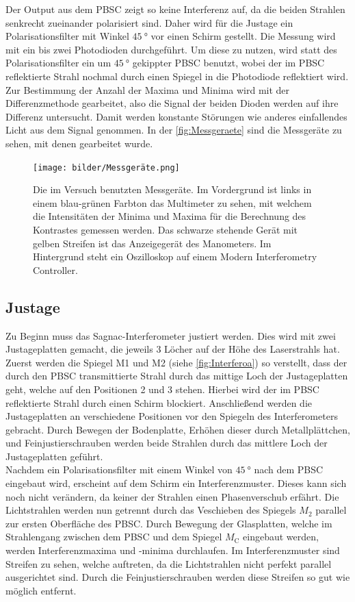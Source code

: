 \noindent Der Output aus dem PBSC zeigt so keine Interferenz auf, da die beiden Strahlen senkrecht zueinander polarisiert sind. Daher wird für die Justage ein Polarisationsfilter mit 
Winkel $\SI{45}{\degree}$ vor einen Schirm gestellt. Die Messung wird mit ein bis zwei Photodioden durchgeführt. Um diese zu nutzen, wird statt des Polarisationsfilter ein um 
$\SI{45}{\degree}$ gekippter PBSC benutzt, wobei der im PBSC reflektierte Strahl nochmal durch einen Spiegel in die Photodiode reflektiert wird. Zur Bestimmung der Anzahl der Maxima 
und Minima wird mit der Differenzmethode gearbeitet, also die Signal der beiden Dioden werden auf ihre Differenz untersucht. Damit werden konstante Störungen wie anderes einfallendes 
Licht aus dem Signal genommen. In der \autoref{fig:Messgeraete} sind die Messgeräte zu sehen, mit denen gearbeitet wurde.

\begin{figure}[H]
    \centering
    \texttt{[image: bilder/Messgeräte.png]}
    \caption{Die im Versuch benutzten Messgeräte. Im Vordergrund ist links in einem blau-grünen Farbton das Multimeter zu sehen, mit welchem die Intensitäten der Minima und Maxima für 
    die Berechnung des Kontrastes gemessen werden. Das schwarze stehende Gerät mit gelben Streifen ist das Anzeigegerät des Manometers. Im Hintergrund steht ein Oszilloskop auf einem 
    Modern Interferometry Controller.}
    \label{fig:Messgeraete}
\end{figure}


\subsection{Justage}

\noindent Zu Beginn muss das Sagnac-Interferometer justiert werden. Dies wird mit zwei Justageplatten gemacht, die jeweils 3 Löcher auf der Höhe des Laserstrahls hat. 
Zuerst werden die Spiegel M1 und M2 (siehe \autoref{fig:Interferoa}) so verstellt, dass der durch den PBSC transmittierte Strahl durch das mittige Loch der Justageplatten geht, welche 
auf den Positionen 2 und 3 stehen. Hierbei wird der im PBSC reflektierte Strahl durch einen Schirm blockiert. 
Anschließend werden die Justageplatten an verschiedene Positionen vor den Spiegeln des Interferometers gebracht. Durch Bewegen der Bodenplatte, Erhöhen dieser durch Metallplättchen, 
und Feinjustierschrauben werden beide Strahlen durch das mittlere Loch der Justageplatten geführt. \\
Nachdem ein Polarisationsfilter mit einem Winkel von $\SI{45}{\degree}$ nach dem PBSC eingebaut wird, erscheint auf dem Schirm ein Interferenzmuster. Dieses kann sich noch nicht verändern, 
da keiner der Strahlen einen Phasenverschub erfährt. Die Lichtstrahlen werden nun getrennt durch das Veschieben des Spiegels $M_2$ parallel zur ersten Oberfläche des PBSC. 
Durch Bewegung der Glasplatten, welche im Strahlengang zwischen dem PBSC und dem Spiegel $M_{\text{C}}$ eingebaut werden, werden Interferenzmaxima und -minima durchlaufen.
Im Interferenzmuster sind Streifen zu sehen, welche auftreten, da die Lichtstrahlen nicht perfekt parallel ausgerichtet sind. Durch die Feinjustierschrauben werden diese Streifen 
so gut wie möglich entfernt. 


